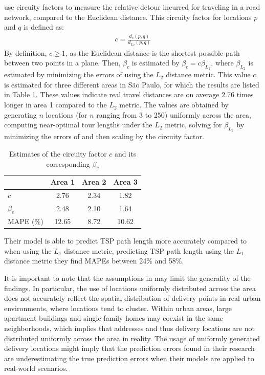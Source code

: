 \citet{merchan2019empirical} use circuity factors to measure the relative detour incurred for traveling in a road network, compared to the Euclidean distance.
This circuity factor for locations $p$ and $q$ is defined as:
\begin{align}
	c = \frac{d_{c}(p,q)}{d_{L_{2}}(p,q)}
\end{align}
By definition, $c \geq 1$, as the Euclidean distance is the shortest possible path between two points in a plane.
Then, $\beta_c$ is estimated by $\beta_c=c\beta_{L_2}$, where $\beta_{L_2}$ is estimated by minimizing the errors of  using the $L_2$ distance metric.
This value $c$, is estimated for three different areas in São Paulo, for which the results are listed in Table
\ref{tab:beta-merchan}.
These values indicate real travel distances are on average 2.76 times longer in area 1 compared to the $L_2$ metric.
The values are obtained by generating $n$ locations (for $n$ ranging from 3 to 250) uniformly across the area, computing near-optimal tour lengths under the $L_2$ metric, solving for $\beta_{L_2}$ by minimizing the errors of  and then scaling by the circuity factor.
\begin{table}[H]
	\centering
	\caption{Estimates of the circuity factor $c$ and its corresponding $\beta_c$ \citep{merchan2019empirical}}
	\label{tab:beta-merchan}
	\begin{tabular}{lccc}
		\toprule
		          & Area 1 & Area 2 & Area 3 \\
		\midrule
		$c$       & 2.76   & 2.34   & 1.82   \\
		$\beta_c$ & 2.48   & 2.10   & 1.64   \\
		MAPE (\%) & 12.65  & 8.72   & 10.62  \\
		\bottomrule
	\end{tabular}
\end{table}
Their model is able to predict TSP path length more accurately compared to when using the $L_1$ distance metric, predicting TSP path length using the $L_1$ distance metric they find MAPEs between 24\% and 58\%.

It is important to note that the assumptions in \cite{merchan2019empirical} may limit the generality of the findings.
In particular, the use of locations uniformly distributed across the area does not accurately reflect the spatial distribution of delivery points in real urban environments, where locations tend to cluster.
Within urban areas, large apartment buildings and single-family homes may coexist in the same neighborhoods, which implies that addresses and thus delivery locations are not distributed uniformly across the area in reality.
The usage of uniformly generated delivery locations might imply that the prediction errors found in their research are underestimating the true prediction errors when their models are applied to real-world scenarios.
